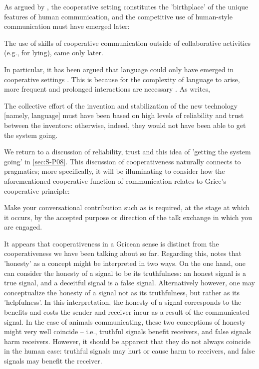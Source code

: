 As argued by \citet{Tomasello08, Tomasello09}, the cooperative setting constitutes the 'birthplace' of the unique features of human communication, and the competitive use of human-style communication must have emerged later:
\begin{quoting}
    The use of skills of cooperative communication outside of collaborative activities (e.g., for lying), came only later.
\end{quoting}
In particular, it has been argued that language could only have emerged in cooperative settings \citep{Tomasello08, Dor17}.
This is because for the complexity of language to arise, more frequent and prolonged interactions are necessary \citep{Benitez21}. As \citet{Dor17} writes,
\begin{quoting}
    The collective effort of the invention and stabilization of the new technology [namely, language] must have been based on high levels of reliability and trust between the inventors: otherwise, indeed, they would not have been able to get the system going.
\end{quoting}
We return to a discussion of reliability, trust and this idea of 'getting the system going' in \cref{sec:S-P08}.
This discussion of cooperativeness naturally connects to pragmatics; more specifically, it will be illuminating to consider how the aforementioned cooperative function of communication relates to Grice's cooperative principle:
\begin{quoting}
    Make your conversational contribution such as is required, at the stage at which it occurs, by the accepted purpose or direction of the talk exchange in which you are engaged.
    \hfill \citep[p.~45]{Grice75}
\end{quoting}
It appears that cooperativeness in a Gricean sense is distinct from the cooperativeness we have been talking about so far.
Regarding this, \citet{Dor17} notes that 'honesty' as a concept might be interpreted in two ways. On the one hand, one can consider the honesty of a signal to be its truthfulness: an honest signal is a true signal, and a deceitful signal is a false signal. Alternatively however, one may conceptualize the honesty of a signal not as its truthfulness, but rather as its 'helpfulness'. In this interpretation, the honesty of a signal corresponds to the benefits and costs the sender and receiver incur as a result of the communicated signal. In the case of animals communicating, these two conceptions of honesty might very well coincide -- i.e., truthful signals benefit receivers, and false signals harm receivers. However, it should be apparent that they do not always coincide in the human case: truthful signals may hurt or cause harm to receivers, and false signals may benefit the receiver.

